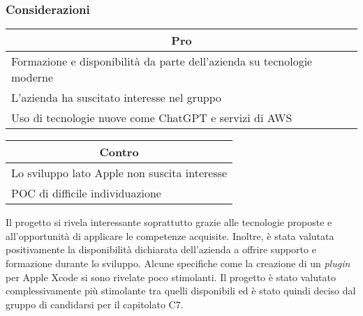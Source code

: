 \subsubsection{Considerazioni}
\begin{minipage}[t]{0.45\linewidth}
    \vspace{0pt}
    {\renewcommand{\arraystretch}{1.5}
    \begin{tabular}{p{1\linewidth}}
        \multicolumn{1}{c}{\textbf{Pro}} \\
        \midrule
        Formazione e disponibilità da parte dell'azienda su tecnologie moderne \\
        L'azienda ha suscitato interesse nel gruppo \\
        Uso di tecnologie nuove come ChatGPT e servizi di AWS \\
        \hline
    \end{tabular}
    }
\end{minipage}
\hspace{0.05\linewidth}
\begin{minipage}[t]{0.45\linewidth}
    \vspace{0pt}
    {\renewcommand{\arraystretch}{1.5}
    \begin{tabular}{p{1\linewidth}}
        \multicolumn{1}{c}{\textbf{Contro}} \\
        \midrule
        Lo sviluppo lato Apple non suscita interesse \\
        POC di difficile individuazione     \\
        \hline
    \end{tabular}
    }
\end{minipage}
\vspace{1em} 

\noindent
Il progetto si rivela interessante soprattutto grazie alle tecnologie proposte e all'opportunità di applicare le competenze acquisite. 
Inoltre, è stata valutata positivamente la disponibilità dichiarata dell'azienda a offrire supporto e formazione durante lo sviluppo.
Alcune specifiche come la creazione di un \textit{plugin} per Apple Xcode si sono rivelate poco stimolanti. 
Il progetto è stato valutato complessivamente più stimolante tra quelli disponibili ed è stato quindi deciso dal gruppo di candidarsi per il capitolato C7.